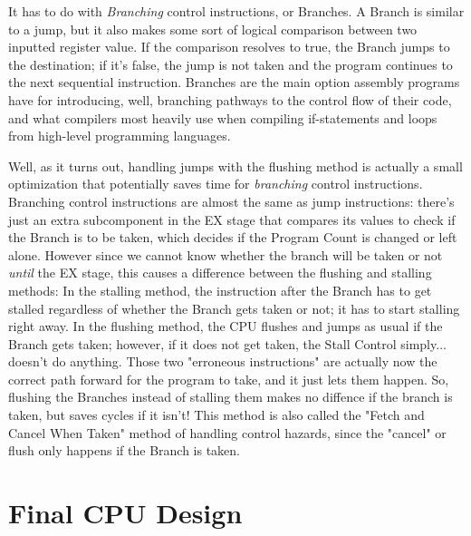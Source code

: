 \documentclass[12pt,twoside]{reedthesis}
\begin{document}
It has to do with \textit{Branching} control instructions, or Branches. A Branch is similar to a jump, but it also makes some sort of logical comparison between two inputted register value. If the comparison resolves to true, the Branch jumps to the destination; if it's false, the jump is not taken and the program continues to the next sequential instruction. Branches are the main option assembly programs have for introducing, well, branching pathways to the control flow of their code, and what compilers most heavily use when compiling if-statements and loops from high-level programming languages.

Well, as it turns out, handling jumps  with the flushing method is actually a small optimization that potentially saves time for \textit{branching} control instructions. Branching control instructions are almost the same as jump instructions: there's just an extra subcomponent in the EX stage that compares its values to check if the Branch is to be taken, which decides if the Program Count is changed or left alone. However since we cannot know whether the branch will be taken or not \textit{until} the EX stage, this causes a difference between the flushing and stalling methods: In the stalling method, the instruction after the Branch has to get stalled regardless of whether the Branch gets taken or not; it has to start stalling right away. In the flushing method, the CPU flushes and jumps as usual if the Branch gets taken; however, if it does not get taken, the Stall Control simply... doesn't do anything. Those two "erroneous instructions" are actually now the correct path forward for the program to take, and it just lets them happen. So, flushing the Branches instead of stalling them makes no diffence if the branch is taken, but saves cycles if it isn't! This method is also called the "Fetch and Cancel When Taken" method of handling control hazards, since the "cancel" or flush only happens if the Branch is taken.

\section{Final CPU Design}
\end{document}
